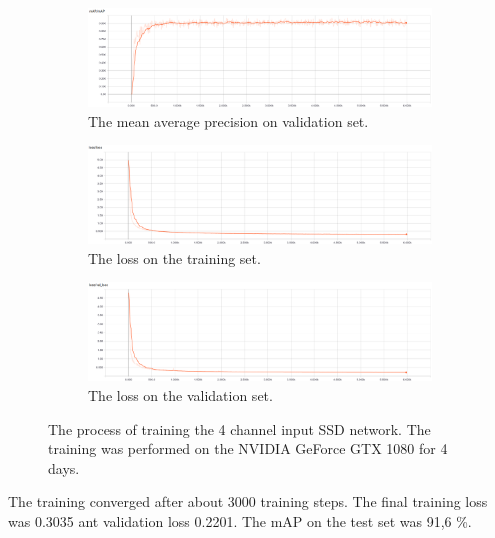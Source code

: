\documentclass[a4paper,12pt,titlepage, twoside]{article}
\numberwithin{figure}{section}
\begin{document}
\begin{figure}[H]
    \begin{subfigure}[Sample1]{1\linewidth} 
    	\includegraphics[width=0.95\linewidth]{fig/ssd_rgbd/mAP.png}
        \caption{The mean average precision on validation set.}   
        \label{fig:ssd_mAP}
    \end{subfigure}
    \begin{subfigure}[Sample1]{1\linewidth} 
    	\includegraphics[width=0.95\linewidth]{fig/ssd_rgbd/loss.png}
        \caption{The loss on the training set.}   
        \label{fig:ssd_loss}
    \end{subfigure}    
	\begin{subfigure}[Sample1]{1\linewidth} 
    	\includegraphics[width=0.95\linewidth]{fig/ssd_rgbd/val_loss.png}
        \caption{The loss on the validation set.}   
        \label{fig:ssd_val_loss}
    \end{subfigure}    
    \caption{The process of training the 4 channel input SSD network. The training was performed on the NVIDIA GeForce GTX 1080 for 4 days.}
    \label{fig:ssd_training}
\end{figure}

The training converged after about 3000 training steps. The final training loss was 0.3035 ant validation loss 0.2201. The mAP on the test set was 91,6 \%.
\end{document}
